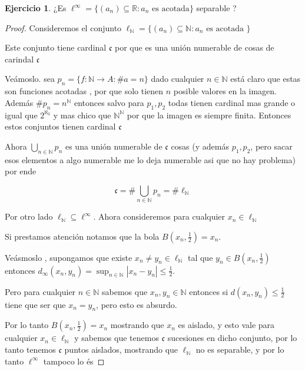 \documentclass[11pt]{report}
\newcommand{\n}{\aleph_{0}}
\newcommand{\R}{\mathbb{R}}
\newcommand{\N}{\mathbb{N}}
\newcommand{\ra}{\rightarrow}
\theoremstyle{definition}
\newtheorem{ej}{Ejercicio}
\begin{document}
\begin{ej}
	¿Es $\ell^{\infty} = \{(a_n) \subseteq  \R : a_n \text{ es acotada}\}$ separable ?
	\begin{proof}
		Consideremos el conjunto $\ell_{\N} = \{(a_n)\subseteq \N : a_n \text{ es acotada }\}$

		Este conjunto tiene cardinal $\mathfrak{c}$ por que es una unión numerable de cosas de carindal $\mathfrak{c}$

		Veámoslo. sea $p_n= \{f: \N \ra A : \# a =n  \}$ dado cualquier $n \in \N$ está claro que estas son funciones acotadas , por que solo tienen $n$ posible valores en la imagen. Además $\# p_n = n^\N$ entonces salvo para $p_1,p_2$ todas tienen cardinal mas grande o igual que $2^{\n}$ y mas chico que $\N ^\N$ por que la imagen es siempre finita. Entonces estos conjuntos tienen cardinal $\mathfrak{c}$

		Ahora $\bigcup_{n\in\N} p_n $ es una unión numerable de $\mathfrak{c}$ cosas (y además $p_1,p_2$, pero sacar esos elementos a algo numerable me lo deja numerable asi que no hay problema) por ende 

		$$\mathfrak{c} = \# \bigcup_{n\in\N} p_n = \# \ell_{\N} $$

		Por otro lado $\ell_{\N} \subseteq \ell^{\infty}$. Ahora consideremos para cualquier $x_n \in \ell_{\N}$ 

		Si prestamos atención notamos que la bola $B(x_n,\frac{1}{2}) = x_n$. 

		Veásmoslo , supongamos que existe $x_n \neq y_n \in \ell_{\N}$ tal que $y_n \in B(x_n,\frac{1}{2})$ entonces $d_{\infty}(x_n,y_n) = \sup_{n \in \N} |x_n - y_n| \leq \frac{1}{2}$.

		Pero para cualquier $n \in \N$ sabemos que $x_n,y_n \in \N$ entonces si $d(x_n,y_n) \leq \frac{1}{2}$ tiene que ser que $x_n = y_n $, pero esto es absurdo. 

		Por lo tanto $B(x_n,\frac{1}{2}) = x_n$ mostrando que $x_n$ es aislado, y esto vale para cualquier $x_n \in \ell_{\N}$ y sabemos que tenemos $\mathfrak{c}$ sucesiones en dicho conjunto, por lo tanto tenemos $\mathfrak{c}$ puntos aislados, mostrando que $\ell_{\N}$ no es separable, y por lo tanto $\ell^{\infty}$ tampoco lo és
	\end{proof}
	
	
\end{ej}
\end{document}

